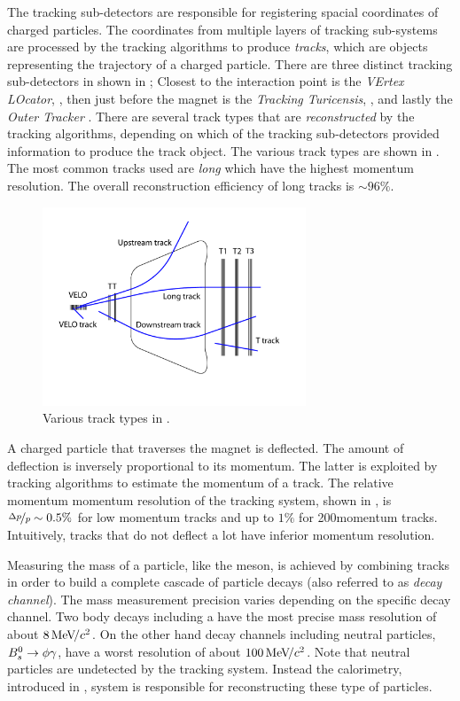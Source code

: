 The tracking sub-detectors are responsible for registering spacial coordinates of charged particles.
The coordinates from multiple layers of tracking sub-systems are processed by the tracking algorithms
to produce {\it tracks}, which are objects representing the trajectory of a charged particle. There are
three distinct tracking sub-detectors in \lhcb shown in ; Closest to the interaction point is
the {\it VErtex LOcator}, \velo, then just before the \lhcb magnet is the {\it Tracking Turicensis}, \ttracker,
and  lastly the {\it Outer Tracker} \ot. There are several track types that are {\it reconstructed} by
the tracking algorithms, depending on which of the tracking sub-detectors provided information to produce
the track object. The various track types are shown in . The most common tracks used are {\it long}
which have the highest momentum resolution. The overall reconstruction efficiency of long tracks is $\sim 96\%$.

\begin{figure}[t]
  \centering
  \includegraphics[width=0.7\textwidth]{Figures/Chapter2/trackTypesRunIAndII}
  \caption{Various track types in \lhcb.}
  \label{track_types}
\end{figure}

A charged particle that traverses the \lhcb magnet is deflected. The amount of deflection is inversely proportional
to its momentum. The latter is exploited by tracking algorithms to estimate the momentum of a track. The relative
momentum momentum resolution of the tracking system, shown in , is $\nicefrac{\Delta p}{p} \sim 0.5 \%$
for low momentum tracks and up to $1\%$ for 200\gevc momentum tracks. Intuitively, tracks that do not deflect a
lot have inferior momentum resolution.

Measuring the mass of a particle, like the \Bs meson, is achieved by combining tracks in order to build a complete
cascade of particle decays (also referred to as {\it decay channel}). The mass measurement precision varies depending
on the specific decay channel. Two body \B decays including a \jpsi have the most precise mass resolution of about
$8 {\mathrm{\,Me\kern -0.1em V\!/}c^2}$. On the other hand decay channels including neutral particles, \ie $B^0_s\rightarrow\phi\gamma$, have a worst resolution of
about $100 {\mathrm{\,Me\kern -0.1em V\!/}c^2}$. Note that neutral particles are undetected by the tracking system. Instead the calorimetry,
introduced in , system is responsible for reconstructing these type of particles.


